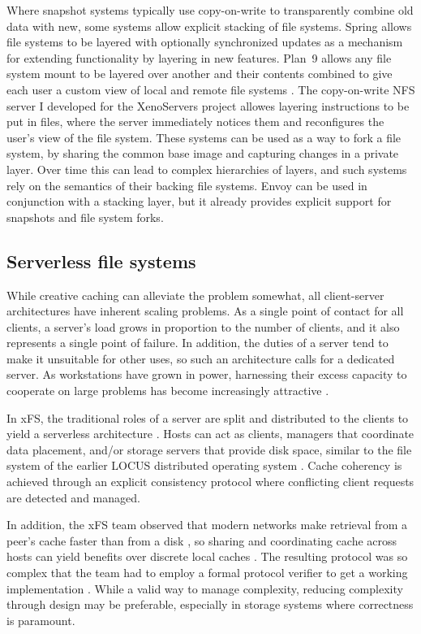 Where snapshot systems typically use copy-on-write to transparently combine old data with new, some systems allow explicit stacking of file systems. Spring \cite{khalidi} allows file systems to be layered with optionally synchronized updates as a mechanism for extending functionality by layering in new features. Plan~9 \cite{pike90} allows any file system mount to be layered over another and their contents combined to give each user a custom view of local and remote file systems \cite{pike92}. The copy-on-write NFS server I developed for the XenoServers project \cite{kotsovinos04b} allowes layering instructions to be put in files, where the server immediately notices them and reconfigures the user's view of the file system. These systems can be used as a way to fork a file system, by sharing the common base image and capturing changes in a private layer. Over time this can lead to complex hierarchies of layers, and such systems rely on the semantics of their backing file systems. Envoy can be used in conjunction with a stacking layer, but it already provides explicit support for snapshots and file system forks.

\subsection{Serverless file systems}

While creative caching can alleviate the problem somewhat, all client-server architectures have inherent scaling problems. As a single point of contact for all clients, a server's load grows in proportion to the number of clients, and it also represents a single point of failure. In addition, the duties of a server tend to make it unsuitable for other uses, so such an architecture calls for a dedicated server. As workstations have grown in power, harnessing their excess capacity to cooperate on large problems has become increasingly attractive \cite{anderson95a}.

In xFS, the traditional roles of a server are split and distributed to the clients to yield a serverless architecture \cite{anderson95b}. Hosts can act as clients, managers that coordinate data placement, and/or storage servers that provide disk space, similar to the file system of the earlier LOCUS distributed operating system \cite{walker}. Cache coherency is achieved through an explicit consistency protocol where conflicting client requests are detected and managed.

In addition, the xFS team observed that modern networks make retrieval from a peer's cache faster than from a disk \cite{dahlin94b}, so sharing and coordinating cache across hosts can yield benefits over discrete local caches \cite{dahlin94a}. The resulting protocol was so complex that the team had to employ a formal protocol verifier to get a working implementation \cite{wang98}. While a valid way to manage complexity, reducing complexity through design may be preferable, especially in storage systems where correctness is paramount.

